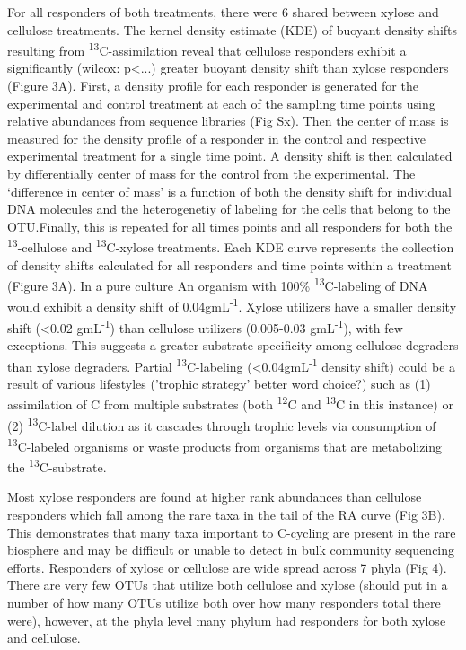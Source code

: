 For all responders of both treatments, there were 6 shared between xylose and cellulose treatments.
The kernel density estimate (KDE) of buoyant density shifts resulting from \textsuperscript{13}C-assimilation reveal that cellulose responders exhibit a significantly (wilcox: p<...) greater buoyant density shift than xylose responders (Figure 3A). First, a density profile for each responder is generated for the experimental and control treatment at each of the sampling time points using relative abundances from sequence libraries (Fig Sx). Then the center of mass is measured for the density profile of a responder in the control and respective experimental treatment for a single time point. A density shift is then calculated by differentially center of mass for the control from the experimental. The ‘difference in center of mass’ is a function of both the density shift for individual DNA molecules and the heterogenetiy of labeling for the cells that belong to the OTU.Finally, this is repeated for all times points and all responders for both the \textsuperscript{13}-cellulose and \textsuperscript{13}C-xylose treatments. Each KDE curve represents the collection of density shifts calculated for all responders and time points within a treatment (Figure 3A). In a pure culture An organism with 100\% \textsuperscript{13}C-labeling of DNA would exhibit a density shift of 0.04gmL\textsuperscript{-1}. Xylose utilizers have a smaller density shift (<0.02 gmL\textsuperscript{-1}) than cellulose utilizers (0.005-0.03 gmL\textsuperscript{-1}), with few exceptions. This suggests a greater substrate specificity among cellulose degraders than xylose degraders. Partial \textsuperscript{13}C-labeling (<0.04gmL\textsuperscript{-1} density shift) could be a result of various lifestyles ('trophic strategy' better word choice?) such as (1) assimilation of C from multiple substrates (both \textsuperscript{12}C and \textsuperscript{13}C in this instance) or (2) \textsuperscript{13}C-label dilution as it cascades through trophic levels via consumption of \textsuperscript{13}C-labeled organisms or waste products from organisms that are metabolizing the \textsuperscript{13}C-substrate.

Most xylose responders are found at higher rank abundances than cellulose responders which fall among the rare taxa in the tail of the RA curve (Fig 3B). This demonstrates that many taxa important to C-cycling are present in the rare biosphere and may be difficult or unable to detect in bulk community sequencing efforts. Responders of xylose or cellulose are wide spread across 7 phyla (Fig 4). There are very few OTUs that utilize both cellulose and xylose (should put in a number of how many OTUs utilize both over how many responders total there were), however, at the phyla level many phylum had responders for both xylose and cellulose.


